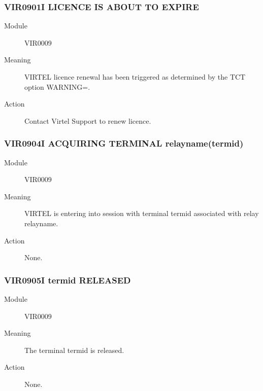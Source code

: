 \documentclass[letterpaper,10pt,english]{sphinxmanual}
\begin{document}
\subsubsection{VIR0901I LICENCE IS ABOUT TO EXPIRE}
\label{\detokenize{messages:vir0901i-licence-is-about-to-expire}}\begin{description}
\item[{Module}] \leavevmode
VIR0009

\item[{Meaning}] \leavevmode
VIRTEL licence renewal has been triggered as determined by the TCT option WARNING=.

\item[{Action}] \leavevmode
Contact Virtel Support to renew licence.

\end{description}


\subsubsection{VIR0904I ACQUIRING TERMINAL relayname(termid)}
\label{\detokenize{messages:vir0904i-acquiring-terminal-relayname-termid}}\begin{description}
\item[{Module}] \leavevmode
VIR0009

\item[{Meaning}] \leavevmode
VIRTEL is entering into session with terminal termid associated with relay relayname.

\item[{Action}] \leavevmode
None.

\end{description}


\subsubsection{VIR0905I termid RELEASED}
\label{\detokenize{messages:vir0905i-termid-released}}\begin{description}
\item[{Module}] \leavevmode
VIR0009

\item[{Meaning}] \leavevmode
The terminal termid is released.

\item[{Action}] \leavevmode
None.

\end{description}
\end{document}
